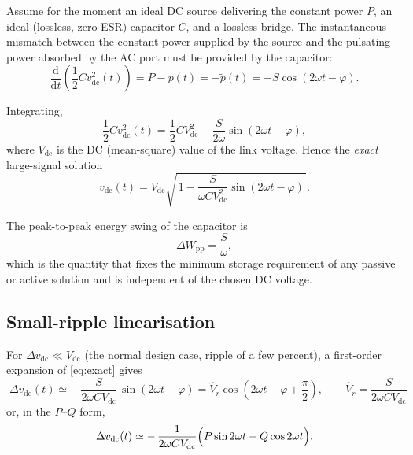 \documentclass[11pt,a4paper]{article}
\begin{document}
Assume for the moment an ideal DC source delivering the constant power $P$, an
ideal (lossless, zero-ESR) capacitor $C$, and a lossless bridge. The
instantaneous mismatch between the constant power supplied by the source and the
pulsating power absorbed by the AC port must be provided by the capacitor:
\begin{equation}
  \frac{\mathrm d}{\mathrm d t}\left(\frac{1}{2}C v_{\mathrm{dc}}^2(t)\right)
  = P - p(t) = -\tilde p(t) = -S\cos(2\omega t - \varphi).
  \label{eq:energy}
\end{equation}

Integrating,
\begin{equation}
  \frac{1}{2}C v_{\mathrm{dc}}^2(t)
  = \frac{1}{2}C V_{\mathrm{dc}}^2
    - \frac{S}{2\omega}\sin(2\omega t - \varphi),
  \label{eq:w}
\end{equation}
where $V_{\mathrm{dc}}$ is the DC (mean-square) value of the link voltage. Hence
the \emph{exact} large-signal solution
\begin{equation}
  v_{\mathrm{dc}}(t)
  = V_{\mathrm{dc}}\sqrt{\,1 - \frac{S}{\omega C V_{\mathrm{dc}}^2}
    \sin(2\omega t - \varphi)\,}.
  \label{eq:exact}
\end{equation}

The peak-to-peak energy swing of the capacitor is
\begin{equation}
  \Delta W_{\mathrm{pp}} = \frac{S}{\omega},
  \label{eq:dW}
\end{equation}
which is the quantity that fixes the minimum storage requirement of any passive
or active solution and is independent of the chosen DC voltage.

\subsection{Small-ripple linearisation}

For $\Delta v_{\mathrm{dc}} \ll V_{\mathrm{dc}}$ (the normal design case, ripple
of a few percent), a first-order expansion of \eqref{eq:exact} gives
\begin{equation}
  \boxed{\;
  \Delta v_{\mathrm{dc}}(t) \simeq
  -\,\frac{S}{2\omega C V_{\mathrm{dc}}}\,\sin(2\omega t - \varphi)
  = \hat V_r \cos\!\left(2\omega t - \varphi + \frac{\pi}{2}\right),
  \qquad
  \hat V_r = \frac{S}{2\omega C V_{\mathrm{dc}}} \;}
  \label{eq:ripple}
\end{equation}
or, in the $P$--$Q$ form,
\begin{equation}
  \Delta v_{\mathrm{dc}}(t) \simeq
  -\,\frac{1}{2\omega C V_{\mathrm{dc}}}
    \Bigl(P \sin 2\omega t - Q \cos 2\omega t\Bigr).
  \label{eq:ripplePQ}
\end{equation}
\end{document}
